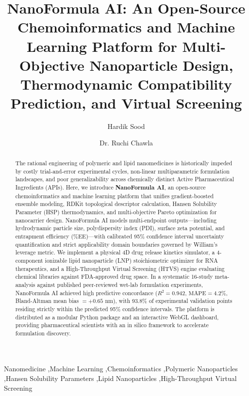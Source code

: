 \documentclass[twocolumn,10pt,3p]{elsarticle}
\begin{document}
\begin{frontmatter}

\title{NanoFormula AI: An Open-Source Chemoinformatics and Machine Learning Platform for Multi-Objective Nanoparticle Design, Thermodynamic Compatibility Prediction, and Virtual Screening}

\author[inst1]{Hardik Sood}

\author[inst1]{Dr. Ruchi Chawla}



\begin{abstract}
The rational engineering of polymeric and lipid nanomedicines is historically impeded by costly trial-and-error experimental cycles, non-linear multiparametric formulation landscapes, and poor generalizability across chemically distinct Active Pharmaceutical Ingredients (APIs). Here, we introduce \textbf{NanoFormula AI}, an open-source chemoinformatics and machine learning platform that unifies gradient-boosted ensemble modeling, RDKit topological descriptor calculation, Hansen Solubility Parameter (HSP) thermodynamics, and multi-objective Pareto optimization for nanocarrier design. NanoFormula AI models multi-endpoint outputs—including hydrodynamic particle size, polydispersity index (PDI), surface zeta potential, and entrapment efficiency (\%EE)—with calibrated 95\% confidence interval uncertainty quantification and strict applicability domain boundaries governed by William's leverage metric. We implement a physical 4D drug release kinetics simulator, a 4-component ionizable lipid nanoparticle (LNP) stoichiometric optimizer for RNA therapeutics, and a High-Throughput Virtual Screening (HTVS) engine evaluating chemical libraries against FDA-approved drug space. In a systematic 16-study meta-analysis against published peer-reviewed wet-lab formulation experiments, NanoFormula AI achieved high predictive concordance ($R^2 = 0.942$, $\text{MAPE} = 4.2\%$, Bland-Altman mean bias $= +0.65\text{ nm}$), with 93.8\% of experimental validation points residing strictly within the predicted 95\% confidence intervals. The platform is distributed as a modular Python package and an interactive WebGL dashboard, providing pharmaceutical scientists with an in silico framework to accelerate formulation discovery.
\end{abstract}

\begin{keyword}
Nanomedicine \sep Machine Learning \sep Chemoinformatics \sep Polymeric Nanoparticles \sep Hansen Solubility Parameters \sep Lipid Nanoparticles \sep High-Throughput Virtual Screening
\end{keyword}

\end{frontmatter}
\end{document}
